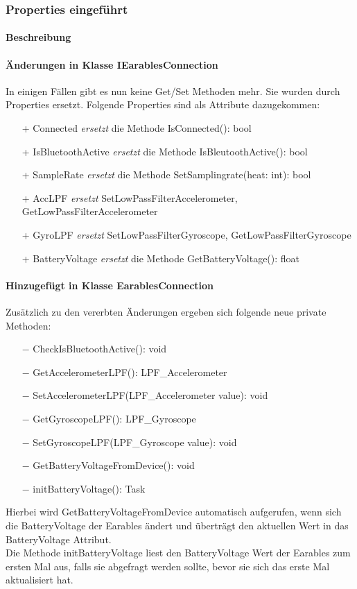 \documentclass[a4paper,12pt]{article}
\begin{document}
\subsubsection{Properties eingeführt}
\paragraph{Beschreibung}
\paragraph{Änderungen in Klasse IEarablesConnection}
In einigen Fällen gibt es nun keine Get/Set Methoden mehr. Sie wurden durch Properties ersetzt.
Folgende Properties sind als Attribute dazugekommen:
\begin{itemize}
	\item[+] Connected \textit{ersetzt } die Methode IsConnected(): bool
	\item[+] IsBluetoothActive  \textit{ersetzt } die Methode IsBleutoothActive(): bool
	\item[+] SampleRate  \textit{ersetzt } die Methode SetSamplingrate(heat: int): bool
	\item[+] AccLPF \textit{ersetzt} SetLowPassFilterAccelerometer, GetLowPassFilterAccelerometer
	\item[+] GyroLPF  \textit{ersetzt} SetLowPassFilterGyroscope, GetLowPassFilterGyroscope
	\item[+] BatteryVoltage  \textit{ersetzt } die Methode GetBatteryVoltage(): float
\end{itemize}

\paragraph{Hinzugefügt in Klasse EarablesConnection}
Zusätzlich zu den vererbten Änderungen ergeben sich folgende neue private Methoden:
\begin{itemize}
	\item[$-$] CheckIsBluetoothActive(): void
	\item[$-$] GetAccelerometerLPF(): LPF\_Accelerometer
	\item[$-$] SetAccelerometerLPF(LPF\_Accelerometer value): void
	\item[$-$] GetGyroscopeLPF(): LPF\_Gyroscope
	\item[$-$] SetGyroscopeLPF(LPF\_Gyroscope value): void
	\item[$-$] GetBatteryVoltageFromDevice(): void
	\item[$-$] initBatteryVoltage(): Task
\end{itemize}
  Hierbei wird GetBatteryVoltageFromDevice automatisch aufgerufen, wenn sich die BatteryVoltage der Earables ändert und überträgt den aktuellen Wert in das BatteryVoltage Attribut.\\
  Die Methode initBatteryVoltage liest den BatteryVoltage Wert der Earables zum ersten Mal aus, falls sie abgefragt werden sollte, bevor sie sich das erste Mal aktualisiert hat.
\end{document}
